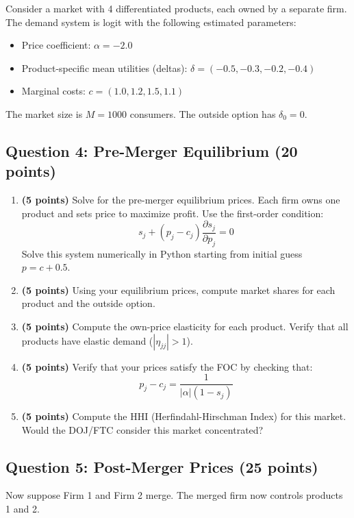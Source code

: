 \documentclass[11pt]{article}
\begin{document}
Consider a market with 4 differentiated products, each owned by a separate firm. The demand system is logit with the following estimated parameters:
\begin{itemize}
\item Price coefficient: $\alpha = -2.0$
\item Product-specific mean utilities (deltas): $\delta = (-0.5, -0.3, -0.2, -0.4)$
\item Marginal costs: $c = (1.0, 1.2, 1.5, 1.1)$
\end{itemize}

The market size is $M = 1000$ consumers. The outside option has $\delta_0 = 0$.

\subsection*{Question 4: Pre-Merger Equilibrium (20 points)}

\begin{enumerate}
\item \textbf{(5 points)} Solve for the pre-merger equilibrium prices. Each firm owns one product and sets price to maximize profit. Use the first-order condition:
\[
s_j + (p_j - c_j) \frac{\partial s_j}{\partial p_j} = 0
\]
Solve this system numerically in Python starting from initial guess $p = c + 0.5$.

\item \textbf{(5 points)} Using your equilibrium prices, compute market shares for each product and the outside option.

\item \textbf{(5 points)} Compute the own-price elasticity for each product. Verify that all products have elastic demand ($|\eta_{jj}| > 1$).

\item \textbf{(5 points)} Verify that your prices satisfy the FOC by checking that:
\[
p_j - c_j = \frac{1}{|\alpha|(1-s_j)}
\]

\item \textbf{(5 points)} Compute the HHI (Herfindahl-Hirschman Index) for this market. Would the DOJ/FTC consider this market concentrated?
\end{enumerate}

\subsection*{Question 5: Post-Merger Prices (25 points)}

Now suppose Firm 1 and Firm 2 merge. The merged firm now controls products 1 and 2.
\end{document}
